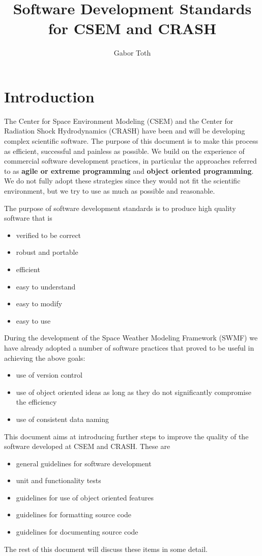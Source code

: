 \documentclass{article}
\title{Software Development Standards for CSEM and CRASH}
\author{Gabor Toth}
\begin{document}
\maketitle

\newpage

\tableofcontents

\newpage

\section{Introduction}

The Center for Space Environment Modeling (CSEM) 
and the Center for Radiation Shock Hydrodynamics (CRASH) have been
and will be developing complex scientific software. 
The purpose of this document is
to make this process as efficient, successful and painless as possible.
We build on the experience of commercial software development practices, 
in particular the approaches referred to as {\bf agile or extreme programming}
and {\bf object oriented programming}. 
We do not fully adopt these strategies since they would not fit the 
scientific environment, but we try to use as much as possible and reasonable. 

The purpose of software development standards is to produce high quality 
software that is
\begin{itemize}
\item verified to be correct
\item robust and portable
\item efficient
\item easy to understand
\item easy to modify
\item easy to use
\end{itemize}
During the development of the Space Weather Modeling Framework (SWMF)
we have already adopted a number of software practices that proved to 
be useful in achieving the above goals:
\begin{itemize}
\item use of version control
\item use of object oriented ideas as long as they do not significantly
      compromise the efficiency 
\item use of consistent data naming
\end{itemize}
This document aims at introducing further steps to improve the quality of the
software developed at CSEM and CRASH. These are
\begin{itemize}
\item general guidelines for software development
\item unit and functionality tests
\item guidelines for use of object oriented features
\item guidelines for formatting source code
\item guidelines for documenting source code
\end{itemize}
The rest of this document will discuss these items in some detail.
\end{document}
